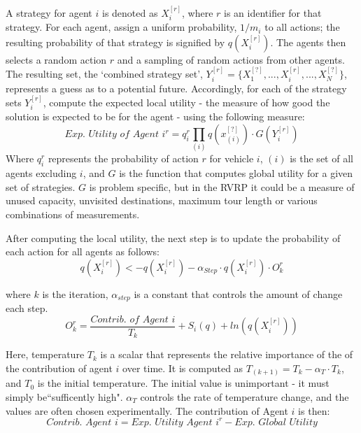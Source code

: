 \documentclass{sig-alternate}
\begin{document}
A strategy for agent $i$ is denoted as $X_i^{[r]}$, where $r$ is an identifier for that strategy. For each agent, assign a uniform probability, $1/m_i$ to all actions; the resulting probability of that strategy is signified by $q(X_i^{[r]})$. The agents then selects a random action $r$ and a sampling of random actions from other agents. The resulting set, the `combined strategy set', $Y_i^{[r]}=\{X_1^{[?]}, ...,X_i^{[r]}, ...,X_N^{[?]}\}$, represents a guess as to a potential future. Accordingly, for each of the strategy sets $Y_i^{[r]}$, compute the expected local utility - the measure of how good the solution is expected to be for the agent - using the following measure:
	\begin{equation}
	\textit{Exp. Utility of Agent } i^r =q_i^r\prod_{(i)}{q(x_{(i)}^{[?]})\cdot G(Y_i^{[r]})}
	\end{equation}
Where $q_i^r$ represents the probability of action $r$ for vehicle $i$, $(i)$ is the set of all agents excluding $i$, and $G$ is the function that computes global utility for a given set of strategies. $G$ is problem specific, but in the RVRP it could be a measure of unused capacity, unvisited destinations, maximum tour length or various combinations of measurements.

After computing the local utility, the next step is to update the probability of each action for all agents as follows:
	\begin{equation}
	q(X_i^{[r]})<-q(X_i^{[r]})-\alpha_{Step}\cdot q(X_i^{[r]})\cdot O_k^r
	\end{equation}
	
where $k$ is the iteration, $\alpha_{step}$ is a constant that controls the amount of change each step.
	\begin{equation}
	O_k^r = \dfrac{\textit{Contrib. of Agent }i}{T_k}+S_i(q)+ln(q(X_i^{[r]}))
	\end{equation}
	
Here, temperature $T_k$ is a scalar that represents the relative importance of the of the contribution of agent $i$ over time. It is computed as $T_{(k+1)}=T_{k} - \alpha_{T}\cdot T_{k}$, and $T_0$ is the initial temperature. The initial value is unimportant - it must simply be``sufficently high"\cite{Book}. $\alpha_{T}$ controls the rate of temperature change, and the values are often chosen experimentally.
The contribution of Agent $i$ is then:
	\begin{equation}
	\textit{Contrib. Agent }i = \textit{Exp. Utility Agent }i^r - \textit{Exp. Global Utility}
	\end{equation}
	
\end{document}
